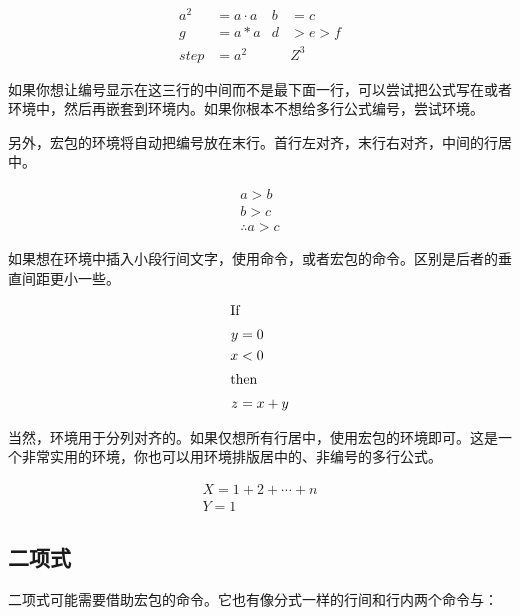 \begin{codeshow}
\begin{align}
  a^2&= a\cdot a& b&=c\nonumber\\
  g  &= a*a & d&>e>f  \nonumber\\
  step&= a^2 & &Z^3
\end{align}
\end{codeshow}

如果你想让编号显示在这三行的中间而不是最下面一行，可以尝试把公式写在或者环境中，然后再嵌套到环境内。如果你根本不想给多行公式编号，尝试环境。

另外，宏包的环境将自动把编号放在末行。首行左对齐，末行右对齐，中间的行居中。
\begin{codeshow}
\begin{multline}
a>b \\
b>c \\
\therefore a>c
\end{multline}
\end{codeshow}

如果想在环境中插入小段行间文字，使用命令，或者宏包的命令。区别是后者的垂直间距更小一些。

\begin{codeshow}
\begin{align*}
\shortintertext{If}
 y &= 0 \\
 x &< 0\\
\shortintertext{then}
 z &= x+y
\end{align*}
\end{codeshow}

当然，环境用于分列对齐的。如果仅想所有行居中，使用宏包的环境即可。这是一个非常实用的环境，你也可以用环境排版居中的、非编号的多行公式。

\begin{codeshow}
\begin{gather}
  X=1+2+\cdots+n \\
  Y=1
\end{gather}
\end{codeshow}

\subsection{二项式}
\label{subsec:binom}
二项式可能需要借助宏包的命令。它也有像分式一样的行间和行内两个命令与：


